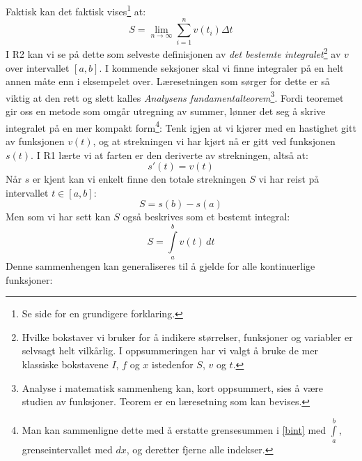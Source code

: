 Faktisk kan det faktisk vises\footnote{Se side \pageref{bintforklaring} for en grundigere forklaring.} at: 
\[ S = \lim\limits_{n\to \infty}\sum\limits_{i=1}^{n} v(t_{i})\Delta t \]
I R2 kan vi se på dette som selveste definisjonen av  \textit{det bestemte integralet}\footnote{Hvilke bokstaver vi bruker for å indikere størrelser, funksjoner og variabler er selvsagt helt vilkårlig. I oppsummeringen har vi valgt å bruke de mer klassiske bokstavene $ I $, $ f $ og $ x $ istedenfor $ S $, $ v $ og $ t $.} av $ v $ over intervallet $ [a, b] $.\regv
\bint
{}\regv
I kommende seksjoner skal vi finne integraler på en helt annen måte enn i eksempelet over. Læresetningen som sørger for dette er så viktig at den rett og slett kalles \textit{Analysens fundamentalteorem}\footnote{Analyse i matematisk sammenheng kan, kort oppsummert, sies å være studien av funksjoner. Teorem er en læresetning som kan bevises.}. Fordi teoremet gir oss en metode som omgår utregning av summer, lønner det seg å skrive integralet på en mer kompakt form\footnote{Man kan sammenligne dette med å erstatte grensesummen i \eqref{bint} med $ \int\limits_{a}^b $, grenseintervallet med $ dx $, og deretter fjerne alle indekser.}:\regv
\bintto
\label{bestmintend}
Tenk igjen at vi kjører med en hastighet gitt av funksjonen $ v(t) $, og at strekningen vi har kjørt nå er gitt ved funksjonen $ s(t) $. I R1 lærte vi at farten er den deriverte av strekningen, altså at:
\[ s'(t)= v(t) \]
Når $ s $ er kjent kan vi enkelt finne den totale strekningen $ S $ vi har reist på intervallet $ t\in[a, b] $:
\[ S = s(b)-s(a) \]
Men som vi har sett kan $S $ også beskrives som et bestemt integral:
\[ S = \int\limits_{a}^b v(t)\,dt \]
Denne sammenhengen kan generaliseres til å gjelde for alle kontinuerlige funksjoner:\regv
